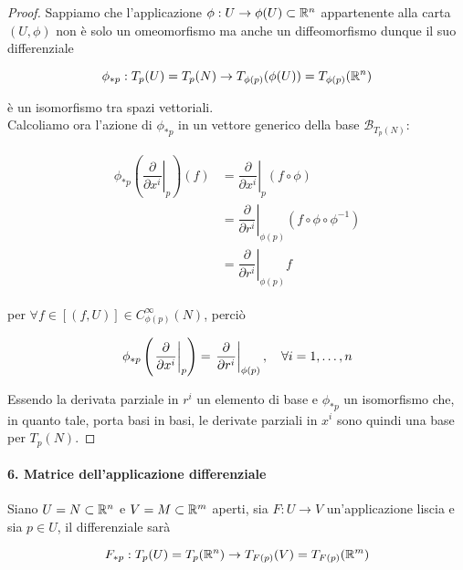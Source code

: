 \begin{proof}
	Sappiamo che l'applicazione $ \phi : U \to \phi(U) \subset \mathbb{R}^{n} $ appartenente alla carta $ (U,\phi) $ non è solo un omeomorfismo ma anche un diffeomorfismo dunque il suo differenziale
	
	\begin{equation}
		\phi_{*p} : T_{p}(U) = T_{p}(N) \to T_{\phi(p)}(\phi(U)) = T_{\phi(p)}(\mathbb{R}^{n})
	\end{equation}

	è un isomorfismo tra spazi vettoriali.\\
	Calcoliamo ora l'azione di $ \phi_{*p} $ in un vettore generico della base $ \mathcal{B}_{T_{p}(N)} $:
	
	\begin{align}
		\begin{split}
			\phi_{*p} \left( \left. \dfrac{\partial}{\partial x^{i}} \right|_{p} \right) (f) &= \left. \dfrac{\partial}{\partial x^{i}} \right|_{p} (f \circ \phi)\\
			&= \left. \dfrac{\partial}{\partial r^{i}} \right|_{\phi(p)} (f \circ \phi \circ \phi^{-1})\\
			&= \left. \dfrac{\partial}{\partial r^{i}} \right|_{\phi(p)} f
		\end{split}
	\end{align}

	per $ \forall f \in [(f,U)] \in C_{\phi(p)}^{\infty}(N) $, perciò
	
	\begin{equation}
		\phi_{*p} \left( \left. \dfrac{\partial}{\partial x^{i}} \right|_{p} \right) = \left. \dfrac{\partial}{\partial r^{i}} \right|_{\phi(p)} \qcomma \forall i=1,\dots,n
	\end{equation}

	Essendo la derivata parziale in $ r^{i} $ un elemento di base e $ \phi_{*p} $ un isomorfismo che, in quanto tale, porta basi in basi, le derivate parziali in $ x^{i} $ sono quindi una base per $ T_{p}(N) $.
\end{proof}

\paragraph{6. Matrice dell'applicazione differenziale}

Siano $ U = N \subset \mathbb{R}^{n} $ e $ V = M \subset \mathbb{R}^{m} $ aperti, sia $ F : U \to V $ un'applicazione liscia e sia $ p \in U $, il differenziale sarà

\begin{equation}
	F_{*p} : T_{p}(U) = T_{p}(\mathbb{R}^{n}) \to T_{F(p)}(V) = T_{F(p)}(\mathbb{R}^{m})
\end{equation}

